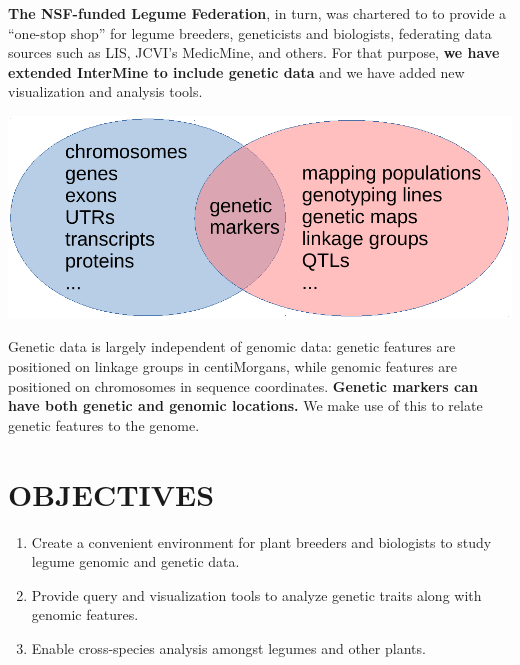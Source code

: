 \documentclass[]{pagposter}
\newlength{\figwidth}
\begin{document}
\begin{multicols*}{3}
  \textbf{The NSF-funded Legume Federation}, in turn, was chartered to to provide a ``one-stop shop'' for legume breeders, geneticists and biologists, federating data sources such as LIS, JCVI's MedicMine, and others.
  For that purpose, \textbf{we have extended InterMine to include genetic data} and we have added new visualization and analysis tools.

  \begin{center}
    \includegraphics[width=\figwidth]{genetics-genomics-venn.pdf} %
  \end{center}

  Genetic data is largely independent of genomic data: genetic features are positioned on linkage groups in centiMorgans, while genomic features are positioned on chromosomes in sequence coordinates.
  \textbf{Genetic markers can have both genetic and genomic locations.} We make use of this to relate genetic features to the genome.


  \section*{OBJECTIVES}
  
  \begin{enumerate}
  \item Create a convenient environment for plant breeders and biologists to study legume genomic and genetic data.
  \item Provide query and visualization tools to analyze genetic traits along with genomic features.
  \item Enable cross-species analysis amongst legumes and other plants.
  \end{enumerate}


\end{multicols*}
\end{document}
